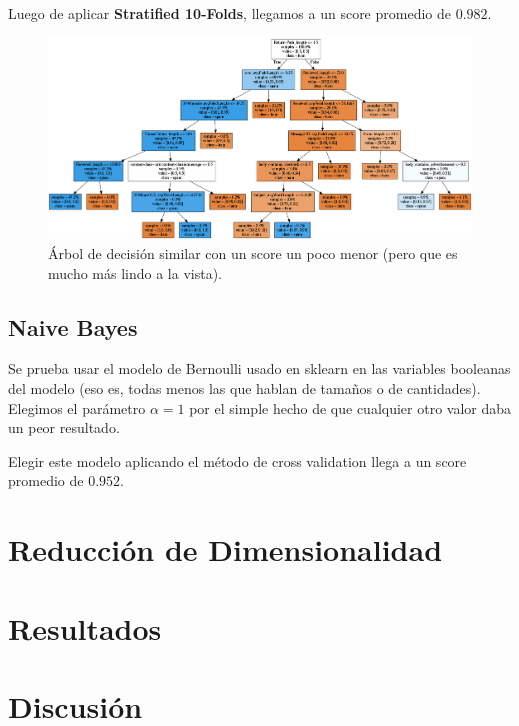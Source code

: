 \documentclass[a4paper, 11pt]{article}
\begin{document}
Luego de aplicar \textbf{Stratified 10-Folds}, llegamos a un score promedio de \( \mathbf{0.982} \).

\begin{figure}
	\centerline{\includegraphics[width=1.3\textwidth]{tree.png}}
	\caption{Árbol de decisión similar con un score un poco menor (pero que es mucho más lindo a la vista).}
\end{figure}

\subsection{Naive Bayes}

Se prueba usar el modelo de Bernoulli usado en sklearn en las variables booleanas del modelo (eso es, todas menos las que hablan de tamaños o de cantidades). Elegimos el parámetro \( \alpha = 1 \) por el simple hecho de que cualquier otro valor daba un peor resultado.

Elegir este modelo aplicando el método de cross validation llega a un score promedio de \( \mathbf{0.952} \).

\section{Reducción de Dimensionalidad}

\section{Resultados}

\section{Discusión}
\end{document}
